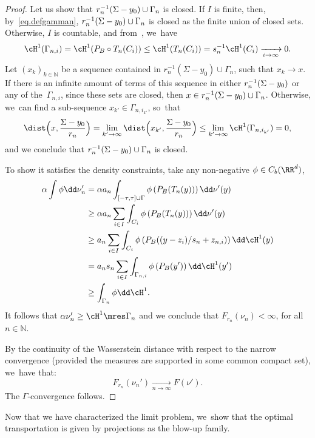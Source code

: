 \begin{proof}
Let us show that $r_n^{-1}(\Sigma -\nobreak y_0) \cup\nobreak \Gamma_n$ is closed. If $I$ is finite, then, by~\eqref{eq.defgamman}, $r_n^{-1}(\Sigma -\nobreak y_0) \cup\nobreak \Gamma_n$ is closed as the finite union of closed sets.
Otherwise, $I$ is countable, and from~\cite[Lem.\,2.6]{paolini2013existence}, we~have
\[
\cH^1(\Gamma_{n,i})
=
\cH^1(P_B\circ T_n(C_i))
\le
\cH^1(T_n(C_i))
=
s_n^{-1} \cH^1(C_i)
\xrightarrow[i \to \infty]{} 0.
\]
Let ${\left(x_k\right)}_{k \in \mathbb{N}}$ be a sequence contained in $r_n^{-1}(\Sigma - y_0) \cup \Gamma_n$, such that $x_k \to x$. If there is an infinite amount of terms of this sequence in either $r_n^{-1}(\Sigma -\nobreak y_0)$ or any of the~$\Gamma_{n,i}$, since these sets are closed, then $x \in r_n^{-1}(\Sigma -\nobreak y_0) \cup\nobreak \Gamma_n$. Otherwise, we~can find a sub-sequence $x_{k'} \in \Gamma_{n, i_{k'}}$, so~that
\[
\dist\Bigl(
x, \frac{\Sigma - y_0}{r_n}
\Bigr)
=
\lim_{k' \to \infty}
\dist \Bigl(
x_{k'}, \frac{\Sigma - y_0}{r_n}
\Bigr)
\le
\lim_{k' \to \infty} \cH^1(\Gamma_{n,i_{k'}}) = 0,
\]
and we conclude that $r_n^{-1}(\Sigma -\nobreak y_0) \cup\nobreak \Gamma_n$ is closed.

To show it satisfies the density constraints, take any non-negative $\phi\in C_b(\RR^d)$,
\begin{align*}
\alpha\int\phi\dd \nu_n'
&= \alpha a_n\int_{[-\tau,\tau]\cup \Gamma}\phi\left(P_B(T_n(y))\right)\dd \nu'(y)\\
&\ge \alpha a_n\sum_{i\in I}\int_{C_{i}}\phi\left(P_B(T_n(y))\right)\dd \nu'(y)\\
&\ge a_n\sum_{i\in I}\int_{C_{i}}\phi\left(P_B((y-z_{i})/s_{n}+z_{n,i})\right)\dd \cH^{1}(y)\\
&= a_n s_{n}\sum_{i\in I}\int_{\Gamma_{n,i}}\phi\left(P_B(y')\right)\dd \cH^{1}(y')\\
&
\ge \int_{\Gamma_{n}} \phi \dd \cH^{1}.
\end{align*}
It follows that $\alpha \nu_n'\geq \cH^1\mres \Gamma_{n}$ and we conclude that $F_{r_n}(\nu_n) < \infty$, for all $n \in \mathbb{N}$.

By the continuity of the Wasserstein distance with
respect to the narrow convergence (provided the measures are supported in some common compact set), we~have that:
\[
F_{r_n}(\nu_n') \xrightarrow[n \to \infty]{} F(\nu').
\]
The $\Gamma$-convergence follows.
\end{proof}

Now that we have characterized the limit problem, we~show that the optimal transportation is given by projections as the blow-up family.

